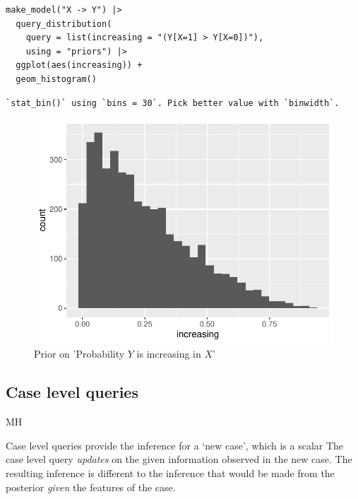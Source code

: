 \documentclass[
  article]{jss}
\begin{document}
\begin{verbatim}
make_model("X -> Y") |> 
  query_distribution(
    query = list(increasing = "(Y[X=1] > Y[X=0])"), 
    using = "priors") |>
  ggplot(aes(increasing)) +
  geom_histogram()
\end{verbatim}

\begin{verbatim}
`stat_bin()` using `bins = 30`. Pick better value with `binwidth`.
\end{verbatim}

\begin{figure}[H]

{\centering \includegraphics{paper_files/figure-pdf/unnamed-chunk-39-1.pdf}

}

\caption{Prior on 'Probability \(Y\) is increasing in \(X\)'}

\end{figure}

\hypertarget{case-level-queries}{%
\subsection{Case level queries}\label{case-level-queries}}

MH

Case level queries provide the inference for a `new case', which is a
scalar The case level query \emph{updates} on the given information
observed in the new case. The resulting inference is different to the
inference that would be made from the posterior \emph{given} the
features of the case.
\end{document}
